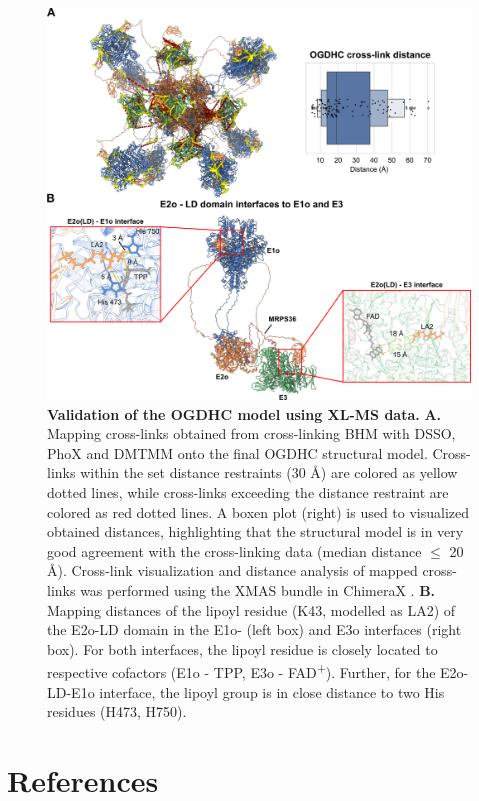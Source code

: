 \begin{subappendices}
\begin{figure}[hbt]
		\includegraphics[]{Chapter.5/Figures/SI_Figure4.png}
		\caption{\textbf{Validation of the OGDHC model using XL-MS data.} \textbf{A.} Mapping cross-links obtained from cross-linking BHM with DSSO, PhoX and DMTMM onto the final OGDHC structural model. Cross-links within the set distance restraints (30 Å) are colored as yellow dotted lines, while cross-links exceeding the distance restraint are colored as red dotted lines. A boxen plot (right) is used to visualized obtained distances, highlighting that the structural model is in very good agreement with the cross-linking data (median distance $\leq$ 20 Å). Cross-link visualization and distance analysis of mapped cross-links was performed using the XMAS bundle in ChimeraX \cite{Lagerwaard_2022}. \textbf{B.} Mapping distances of the lipoyl residue (K43, modelled as LA2) of the E2o-LD domain in the E1o- (left box) and E3o interfaces (right box). For both interfaces, the lipoyl residue is closely located to respective cofactors (E1o - TPP, E3o - FAD\textsuperscript{+}). Further, for the E2o-LD-E1o interface, the lipoyl group is in close distance to two His residues (H473, H750).}
		\label{fig:ch5_app_fig4}
	\end{figure}
\end{subappendices}
%
\clearpage
\section*{References}


